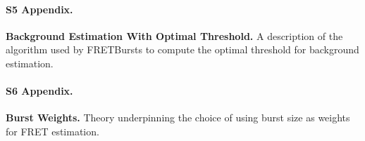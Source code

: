 \documentclass[10pt,letterpaper]{article}
\begin{document}
\paragraph*{S5 Appendix.}
\label{sec:bg_opt_th}
{\bf Background Estimation With Optimal Threshold.} A description of
the algorithm used by FRETBursts to compute the
optimal threshold for background estimation.

\paragraph*{S6 Appendix.}
\label{sec:burstweights_theory}
{\bf Burst Weights.} Theory underpinning the choice of using burst size
as weights for FRET estimation.

\nolinenumbers

\end{document}
